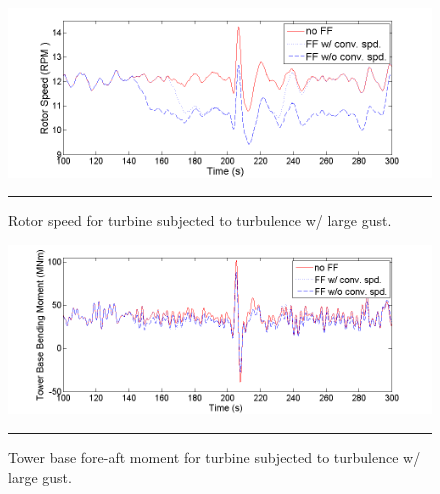 \begin{figure}[htbp]
	\centering
		\includegraphics[trim = {1cm 0 2cm 0}, clip, width = \linewidth]{Figures/ch4Figures/fig4-28.png}
		\rule{35em}{0.5pt}
	\caption{Rotor speed for turbine subjected to turbulence w/ large gust.}
	\label{fig4-28}
\end{figure}

\begin{figure}[htbp]
	\centering
		\includegraphics[trim = {1cm 0 2cm 0}, clip, width = \linewidth]{Figures/ch4Figures/fig4-29.png}
		\rule{35em}{0.5pt}
	\caption{Tower base fore-aft moment for turbine subjected to turbulence w/ large gust.}
	\label{fig4-29}
\end{figure}

